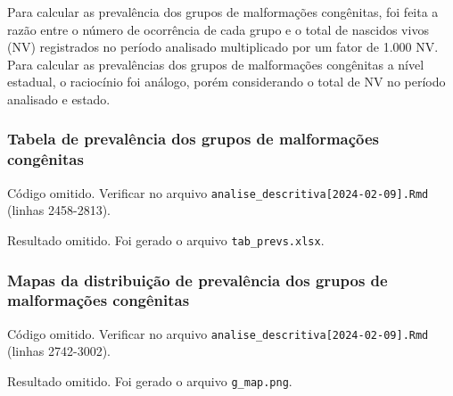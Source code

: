 \documentclass[
]{article}
\begin{document}
Para calcular as prevalência dos grupos de malformações congênitas, foi
feita a razão entre o número de ocorrência de cada grupo e o total de
nascidos vivos (NV) registrados no período analisado multiplicado por um
fator de 1.000 NV. Para calcular as prevalências dos grupos de
malformações congênitas a nível estadual, o raciocínio foi análogo,
porém considerando o total de NV no período analisado e estado.

\hypertarget{tabela-de-prevaluxeancia-dos-grupos-de-malformauxe7uxf5es-conguxeanitas}{%
\subsubsection{Tabela de prevalência dos grupos de malformações
congênitas}\label{tabela-de-prevaluxeancia-dos-grupos-de-malformauxe7uxf5es-conguxeanitas}}

Código omitido. Verificar no arquivo
\texttt{analise\_descritiva{[}2024-02-09{]}.Rmd} (linhas 2458-2813).

Resultado omitido. Foi gerado o arquivo \texttt{tab\_prevs.xlsx}.

\hypertarget{mapas-da-distribuiuxe7uxe3o-de-prevaluxeancia-dos-grupos-de-malformauxe7uxf5es-conguxeanitas}{%
\subsubsection{Mapas da distribuição de prevalência dos grupos de
malformações
congênitas}\label{mapas-da-distribuiuxe7uxe3o-de-prevaluxeancia-dos-grupos-de-malformauxe7uxf5es-conguxeanitas}}

Código omitido. Verificar no arquivo
\texttt{analise\_descritiva{[}2024-02-09{]}.Rmd} (linhas 2742-3002).

Resultado omitido. Foi gerado o arquivo \texttt{g\_map.png}.
\end{document}

